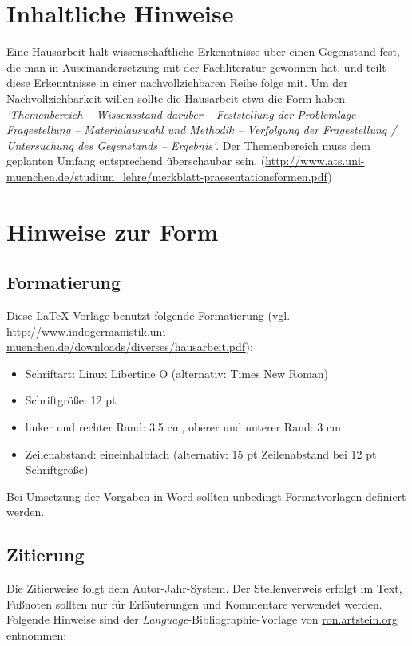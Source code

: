 \documentclass[12pt,letterpaper]{article} %
\begin{document}
\section{Inhaltliche Hinweise}
Eine Hausarbeit hält wissenschaftliche Erkenntnisse über einen Gegenstand fest, die man in Auseinandersetzung mit der Fachliteratur gewonnen hat, und teilt diese Erkenntnisse in einer nachvollziehbaren Reihe folge mit. Um der Nachvollziehbarkeit willen sollte die Hausarbeit etwa die Form haben \emph{'Themenbereich – Wissensstand darüber – Feststellung der Problemlage  – Fragestellung –
Materialauswahl  und  Methodik – Verfolgung  der  Fragestellung  /  Untersuchung  des  Gegenstands – Ergebnis'}. Der Themenbereich  muss  dem  geplanten  Umfang  entsprechend überschaubar sein. (\url{http://www.ats.uni-muenchen.de/studium_lehre/merkblatt-praesentationsformen.pdf})


\section{Hinweise zur Form}
\subsection{Formatierung} 

Diese LaTeX-Vorlage benutzt folgende Formatierung (vgl. \url{http://www.indogermanistik.uni-muenchen.de/downloads/diverses/hausarbeit.pdf}):
\begin{itemize}
\setlength{\itemsep}{0pt}
	\item Schriftart: Linux Libertine O (alternativ: Times New Roman)
	\item Schriftgröße: 12 pt
	\item linker und rechter Rand: 3.5 cm, oberer und unterer Rand: 3 cm
	\item Zeilenabstand: eineinhalbfach (alternativ: 15 pt Zeilenabstand bei 12 pt Schriftgröße)
\end{itemize}

\noindent
Bei Umsetzung der Vorgaben in Word sollten unbedingt Formatvorlagen definiert werden.

\subsection{Zitierung} 
\label{sec:cit}

Die Zitierweise folgt dem Autor-Jahr-System. Der Stellenverweis erfolgt im Text, Fußnoten sollten nur für Erläuterungen und Kommentare verwendet werden. Folgende Hinweise sind der \emph{Language}-Bibliographie-Vorlage von \url{ron.artstein.org} entnommen:\newline
\end{document}
